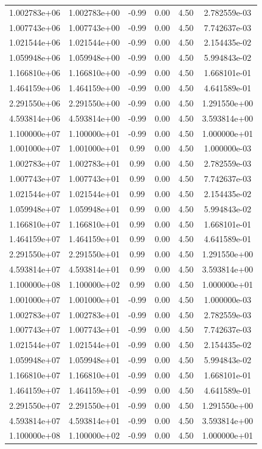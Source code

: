 \documentclass{article}
\begin{document}
\begin{table}[htbp]
\begin{tabular}{cccccc}
1.002783e+06 & 1.002783e+00 & -0.99 & 0.00 & 4.50 & 2.782559e-03 \\
1.007743e+06 & 1.007743e+00 & -0.99 & 0.00 & 4.50 & 7.742637e-03 \\
1.021544e+06 & 1.021544e+00 & -0.99 & 0.00 & 4.50 & 2.154435e-02 \\
1.059948e+06 & 1.059948e+00 & -0.99 & 0.00 & 4.50 & 5.994843e-02 \\
1.166810e+06 & 1.166810e+00 & -0.99 & 0.00 & 4.50 & 1.668101e-01 \\
1.464159e+06 & 1.464159e+00 & -0.99 & 0.00 & 4.50 & 4.641589e-01 \\
2.291550e+06 & 2.291550e+00 & -0.99 & 0.00 & 4.50 & 1.291550e+00 \\
4.593814e+06 & 4.593814e+00 & -0.99 & 0.00 & 4.50 & 3.593814e+00 \\
1.100000e+07 & 1.100000e+01 & -0.99 & 0.00 & 4.50 & 1.000000e+01 \\
1.001000e+07 & 1.001000e+01 & 0.99 & 0.00 & 4.50 & 1.000000e-03 \\
1.002783e+07 & 1.002783e+01 & 0.99 & 0.00 & 4.50 & 2.782559e-03 \\
1.007743e+07 & 1.007743e+01 & 0.99 & 0.00 & 4.50 & 7.742637e-03 \\
1.021544e+07 & 1.021544e+01 & 0.99 & 0.00 & 4.50 & 2.154435e-02 \\
1.059948e+07 & 1.059948e+01 & 0.99 & 0.00 & 4.50 & 5.994843e-02 \\
1.166810e+07 & 1.166810e+01 & 0.99 & 0.00 & 4.50 & 1.668101e-01 \\
1.464159e+07 & 1.464159e+01 & 0.99 & 0.00 & 4.50 & 4.641589e-01 \\
2.291550e+07 & 2.291550e+01 & 0.99 & 0.00 & 4.50 & 1.291550e+00 \\
4.593814e+07 & 4.593814e+01 & 0.99 & 0.00 & 4.50 & 3.593814e+00 \\
1.100000e+08 & 1.100000e+02 & 0.99 & 0.00 & 4.50 & 1.000000e+01 \\
1.001000e+07 & 1.001000e+01 & -0.99 & 0.00 & 4.50 & 1.000000e-03 \\
1.002783e+07 & 1.002783e+01 & -0.99 & 0.00 & 4.50 & 2.782559e-03 \\
1.007743e+07 & 1.007743e+01 & -0.99 & 0.00 & 4.50 & 7.742637e-03 \\
1.021544e+07 & 1.021544e+01 & -0.99 & 0.00 & 4.50 & 2.154435e-02 \\
1.059948e+07 & 1.059948e+01 & -0.99 & 0.00 & 4.50 & 5.994843e-02 \\
1.166810e+07 & 1.166810e+01 & -0.99 & 0.00 & 4.50 & 1.668101e-01 \\
1.464159e+07 & 1.464159e+01 & -0.99 & 0.00 & 4.50 & 4.641589e-01 \\
2.291550e+07 & 2.291550e+01 & -0.99 & 0.00 & 4.50 & 1.291550e+00 \\
4.593814e+07 & 4.593814e+01 & -0.99 & 0.00 & 4.50 & 3.593814e+00 \\
1.100000e+08 & 1.100000e+02 & -0.99 & 0.00 & 4.50 & 1.000000e+01 \\
\hline
\end{tabular}
\end{table}
\end{document}
